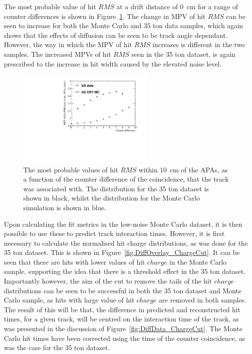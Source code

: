 The most probable value of hit $RMS$ at a drift distance of 0~cm for a range of counter differences is shown in Figure~\ref{fig:DiffMCDataCompInt}. The change in MPV of hit $RMS$ can be seen to increase for both the Monte Carlo and 35 ton data samples, which again shows that the effects of diffusion can be seen to be track angle dependant. However, the way in which the MPV of hit $RMS$ increases is different in the two samples. The increased MPVs of hit $RMS$ seen in the 35 ton dataset, is again prescribed to the increase in hit width caused by the elevated noise level. \\

\begin{figure}
  \centering
  \includegraphics[width=0.6\textwidth]{InterceptCanvasOverlay}
  \caption[The angular dependence of diffusion in the 35 ton dataset and Monte Carlo for hits within 10~cm of the APAs]
          {The most probable values of hit $RMS$ within 10~cm of the APAs, as a function of the counter difference of the coincidence, that the track was associated with. The distribution for the 35 ton dataset is shown in black, whilst the distribution for the Monte Carlo simulation is shown in blue.}
  \label{fig:DiffMCDataCompInt}
\end{figure}

Upon calculating the fit metrics in the low-noise Monte Carlo dataset, it is then possible to use these to predict track interaction times. However, it is first necessary to calculate the normalised hit charge distributions, as was done for the 35 ton dataset. This is shown in Figure~\ref{fig:DiffOverlay_ChargeCut}. It can be seen that there are hits with lower values of hit $charge$ in the Monte Carlo sample, supporting the idea that there is a threshold effect in the 35 ton dataset. Importantly however, the aim of the cut to remove the tails of the hit $charge$ distributions can be seen to be successful in both the 35 ton dataset and Monte Carlo sample, as hits with large value of hit $charge$ are removed in both samples. The result of this will be that, the difference in predicted and reconstructed hit times, for a given track, will be centred on the interaction time of the track, as was presented in the discussion of Figure~\ref{fig:DiffData_ChargeCut}. The Monte Carlo hit times have been corrected using the time of the counter coincidence, as was the case for the 35 ton dataset. \\ 

